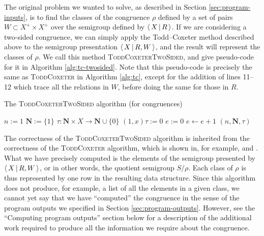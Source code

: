 The original problem we wanted to solve, as described in Section
\ref{sec:program-inputs}, is to find the classes of the congruence $\rho$
defined by a set of pairs $W \subset X^+ \times X^+$ over the semigroup defined
by $\left\langle \, X \, \middle| \, R \, \right\rangle$.  If we are considering
a two-sided congruence, we can simply apply the Todd--Coxeter method described
above to the semigroup presentation $\left\langle \, X \, \middle| \, R,W \, \right\rangle$, and the result will represent the
classes of $\rho$.  We call this method \textsc{ToddCoxeterTwoSided}, and give
pseudo-code for it in Algorithm \ref{alg:tc-twosided}.  Note that this
pseudo-code is precisely the same as \textsc{ToddCoxeter} in Algorithm
\ref{alg:tc}, except for the addition of lines 11--12 which trace all the
relations in $W$, before doing the same for those in $R$.

\begin{algorithm}
\caption{The \textsc{ToddCoxeterTwoSided} algorithm (for congruences)}
\label{alg:tc-twosided}
\begin{algorithmic}[1]
\State $n := 1$
\State $\mathbf{N} := \{1\}$
\State $\tau : \mathbf{N} \times X \to \mathbf{N} \cup \{0\}$
  \State $(1, x)\tau := 0$
\EndFor
\State $e := 0$
\Repeat
  \State $e \gets e + 1$
      \State {}
    \EndFor
      \State {}
    \EndFor
  \EndIf
{}  
\State \Return $(n, \mathbf{N}, \tau)$
\EndProcedure
\end{algorithmic}
\end{algorithm}

The correctness of the \textsc{ToddCoxeterTwoSided} algorithm is inherited from
the correctness of the \textsc{ToddCoxeter} algorithm, which is shown in, for
example, \cite{todd_coxeter_1936} and \cite{beetham_campbell_1976}.  What we
have precisely computed is the elements of the semigroup presented by
$\left\langle \, X \, \middle| \, R,W \, \right\rangle$, or in other words, the quotient semigroup $S / \rho$.  Each
class of $\rho$ is thus represented by one row in the resulting data structure.
Since this algorithm does not produce, for example, a list of all the elements
in a given class, we cannot yet say that we have ``computed'' the congruence in
the sense of the program outputs we specified in Section
\ref{sec:program-outputs}.  However, see the ``Computing program outputs''
section below for a description of the additional work required to produce all
the information we require about the congruence.

